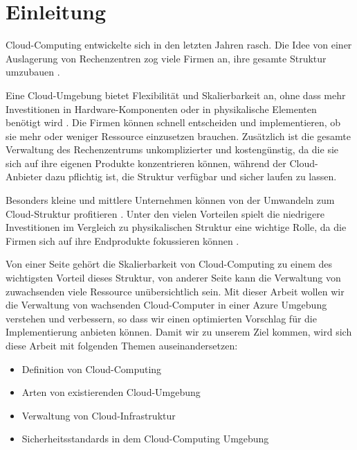 \section{Einleitung}

Cloud-Computing entwickelte sich in den letzten Jahren rasch. Die Idee von einer Auslagerung von Rechenzentren zog viele Firmen an, ihre gesamte Struktur umzubauen \cite{Alalawi_CCR}. 

Eine Cloud-Umgebung bietet Flexibilität und Skalierbarkeit an, ohne dass mehr Investitionen in Hardware-Komponenten oder in physikalische Elementen benötigt wird \cite{Obrutsky_CSAD}. Die Firmen können schnell entscheiden und implementieren, ob sie mehr oder weniger Ressource einzusetzen brauchen. Zusätzlich ist die gesamte Verwaltung des Rechenzentrums unkomplizierter und kostengünstig, da die sie sich auf ihre eigenen Produkte konzentrieren können, während der Cloud-Anbieter dazu pflichtig ist, die Struktur verfügbar und sicher laufen zu lassen.

Besonders kleine und mittlere Unternehmen können von der Umwandeln zum Cloud-Struktur profitieren \cite{Khalid_CCAI}. Unter den vielen Vorteilen spielt die niedrigere Investitionen im Vergleich zu physikalischen Struktur eine wichtige Rolle, da die Firmen sich auf ihre Endprodukte fokussieren können \cite{Donnery_CCSB}.

Von einer Seite gehört die Skalierbarkeit von Cloud-Computing zu einem des wichtigsten Vorteil dieses Struktur, von anderer Seite kann die Verwaltung von zuwachsenden viele Ressource unübersichtlich sein. Mit dieser Arbeit wollen wir die Verwaltung von wachsenden Cloud-Computer in einer Azure Umgebung verstehen und verbessern, so dass wir einen optimierten Vorschlag für die Implementierung anbieten können. Damit wir zu unserem Ziel kommen, wird sich diese Arbeit mit folgenden Themen auseinandersetzen:

\begin{itemize}
   \item Definition von Cloud-Computing
   \item Arten von existierenden Cloud-Umgebung
   \item Verwaltung von Cloud-Infrastruktur
   \item Sicherheitsstandards in dem Cloud-Computing Umgebung
\end{itemize}